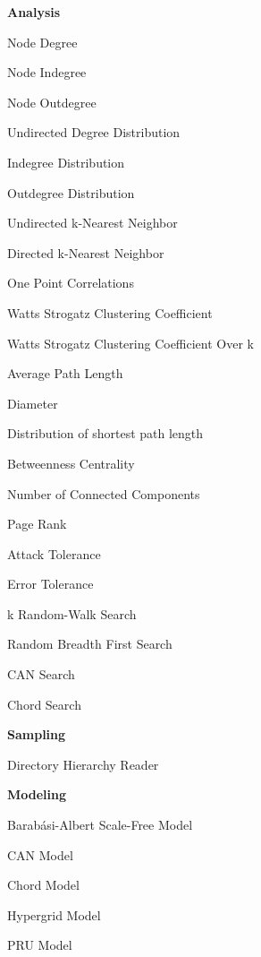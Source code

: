 \begin{multicols}{2}{
\noindent
\begin{tiny} 
\textbf{Analysis}
\begin{list}{}{\setlength{\itemindent}{-7mm}\setlength{\itemsep}{0mm}\setlength{\topsep}{1mm}}
\item Node Degree
\item Node Indegree
\item Node Outdegree
\item Undirected Degree Distribution
\item Indegree Distribution
\item Outdegree Distribution
\item Undirected k-Nearest Neighbor
\item Directed k-Nearest Neighbor
\item One Point Correlations
\item Watts Strogatz Clustering Coefficient
\item Watts Strogatz Clustering Coefficient Over k
\item Average Path Length
\item Diameter
\item Distribution of shortest path length
\item Betweenness Centrality
\item Number of Connected Components
\item Page Rank
\item Attack Tolerance
\item Error Tolerance
\item k Random-Walk Search
\item Random Breadth First Search
\item CAN Search
\item Chord Search
\end{list}
\textbf{Sampling}
\begin{list}{}{\setlength{\itemindent}{-7mm}\setlength{\itemsep}{0mm}\setlength{\topsep}{1mm}}
\item Directory Hierarchy Reader
\end{list}
\textbf{Modeling}
\begin{list}{}{\setlength{\itemindent}{-7mm}\setlength{\itemsep}{0mm}\setlength{\topsep}{1mm}}
\item Barab\'{a}si-Albert Scale-Free Model
\item CAN Model
\item Chord Model
\item Hypergrid Model
\item PRU Model

\end{list}
\end{tiny}}
\end{multicols}
